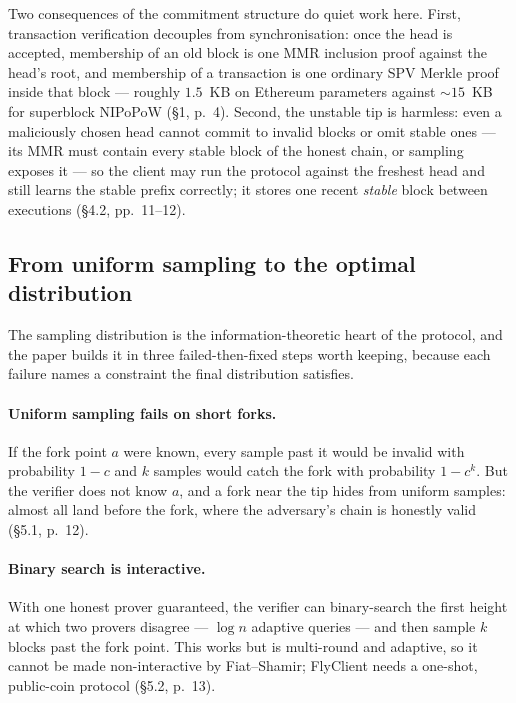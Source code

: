\documentclass[11pt,a4paper]{article}
\theoremstyle{definition}
\begin{document}
Two consequences of the commitment structure do quiet work here. First,
transaction verification decouples from synchronisation: once the head is
accepted, membership of an old block is one MMR inclusion proof against
the head's root, and membership of a transaction is one ordinary SPV
Merkle proof inside that block --- roughly $1.5$~KB on Ethereum
parameters against ${\sim}15$~KB for superblock NIPoPoW (\S1, p.~4).
Second, the unstable tip is harmless: even a maliciously chosen head
cannot commit to invalid blocks or omit stable ones --- its MMR must
contain every stable block of the honest chain, or sampling exposes it
--- so the client may run the protocol against the freshest head and
still learns the stable prefix correctly; it stores one recent
\emph{stable} block between executions (\S4.2, pp.~11--12).

\subsection{From uniform sampling to the optimal distribution}
\label{sec:fc-sampling}

The sampling distribution is the information-theoretic heart of the
protocol, and the paper builds it in three failed-then-fixed steps worth
keeping, because each failure names a constraint the final distribution
satisfies.

\paragraph{Uniform sampling fails on short forks.} If the fork point $a$
were known, every sample past it would be invalid with probability
$1 - c$ and $k$ samples would catch the fork with probability $1 - c^k$.
But the verifier does not know $a$, and a fork near the tip hides from
uniform samples: almost all land before the fork, where the adversary's
chain is honestly valid (\S5.1, p.~12).

\paragraph{Binary search is interactive.} With one honest prover
guaranteed, the verifier can binary-search the first height at which two
provers disagree --- $\log n$ adaptive queries --- and then sample $k$
blocks past the fork point. This works but is multi-round and adaptive,
so it cannot be made non-interactive by Fiat--Shamir; FlyClient needs a
one-shot, public-coin protocol (\S5.2, p.~13).
\end{document}
